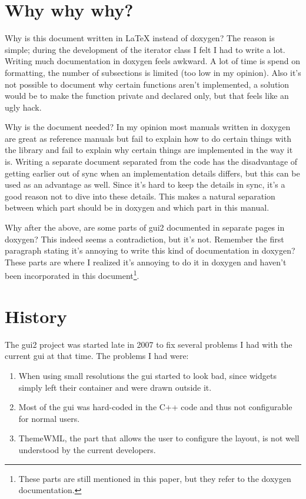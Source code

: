 \documentclass[a4paper,notitlepage]{report}
\begin{document}
\section{Why why why?}

Why is this document written in \LaTeX{} instead of doxygen? The reason is
simple; during the development of the iterator class I felt I had to write a
lot. Writing much documentation in doxygen feels awkward. A lot of time is spend
on formatting, the number of subsections is limited (too low in my opinion).
Also it's not possible to document why certain functions aren't implemented, a
solution would be to make the function private and declared only, but that feels
like an ugly hack.

Why is the document needed? In my opinion most manuals written in doxygen are
great as reference manuals but fail to explain how to do certain things with the
library and fail to explain why certain things are implemented in the way it is.
Writing a separate document separated from the code has the disadvantage of
getting earlier out of sync when an implementation details differs, but this can
be used as an advantage as well. Since it's hard to keep the details in sync,
it's a good reason not to dive into these details. This makes a natural
separation between which part should be in doxygen and which part in this
manual.

Why after the above, are some parts of gui2 documented in separate pages in
doxygen? This indeed seems a contradiction, but it's not. Remember the first
paragraph stating it's annoying to write this kind of documentation in doxygen?
These parts are where I realized it's annoying to do it in doxygen and haven't
been incorporated in this document\footnote{These parts are still mentioned in
this paper, but they refer to the doxygen documentation.}.

\section{History}

The gui2 project was started late in 2007 to fix several problems I had with the
current gui at that time. The problems I had were:
\begin{enumerate}
\item When using small resolutions the gui started to look bad, since widgets
	simply left their container and were drawn outside it.
\item Most of the gui was hard-coded in the C++ code and thus not configurable
	for normal users.
\item ThemeWML, the part that allows the user to configure the layout, is not
	well understood by the current developers.
\end{enumerate}
\end{document}
